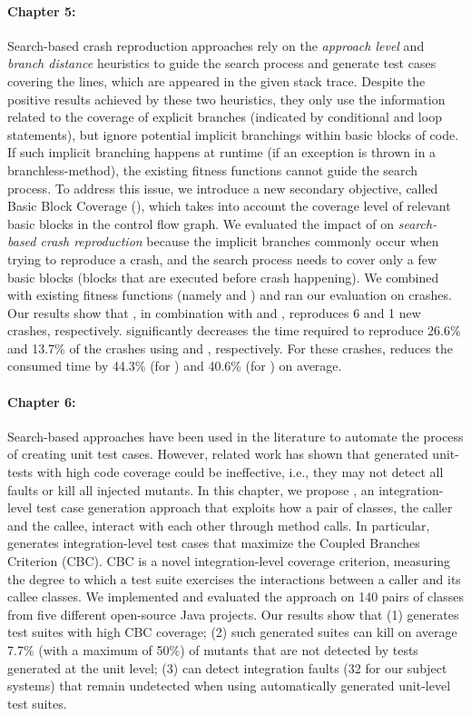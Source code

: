 \paragraph{Chapter 5:}%
Search-based crash reproduction approaches rely on the \emph{approach level} and \emph{branch distance} heuristics to guide the search process and generate test cases covering the lines, which are appeared in the given stack trace.
Despite the positive results achieved by these two heuristics, they only use the information related to the coverage of explicit branches (\eg indicated by conditional and loop statements), but ignore potential implicit branchings within basic blocks of code. 
If such implicit branching happens at runtime (\eg if an exception is thrown in a branchless-method), the existing fitness functions cannot guide the search process. 
To address this issue, we introduce a new secondary objective, called Basic Block Coverage (\bbc), which takes into account the coverage level of relevant basic blocks in the control flow graph. We evaluated the impact of \bbc on \emph{search-based crash reproduction} because the implicit branches commonly occur when trying to reproduce a crash, and the search process needs to cover only a few basic blocks (\ie blocks that are executed before crash happening). We combined \bbc with existing fitness functions (namely \integ and \WS) and ran our evaluation on \crashpack crashes.
Our results show that \bbc, in combination with \integ and \WS, reproduces 6 and 1 new crashes, respectively.
\bbc significantly decreases the time required to reproduce 26.6\% and 13.7\% of the crashes using \integ and \WS, respectively. For these crashes, \bbc reduces the consumed time by 44.3\% (for \integ) and 40.6\% (for \WS) on average.

\paragraph{Chapter 6:}%
Search-based approaches have been used in the literature to automate the process of creating unit test cases. However, related work has shown that generated unit-tests with high code coverage could be ineffective, i.e., they may not detect all faults or kill all injected mutants. 
In this chapter, we propose \cling, an integration-level test case generation approach that exploits how a pair of classes, the caller and the callee, interact with each other through method calls. In particular, \cling generates integration-level test cases that maximize the Coupled Branches Criterion (CBC). CBC is a novel integration-level coverage criterion, measuring the degree to which a test suite exercises the interactions between a caller and its callee classes. 
We implemented \cling and evaluated the approach on 140 pairs of classes from five different open-source Java projects. Our results show that (1) \cling generates test suites with high CBC coverage; (2) such generated suites can kill 
on average 7.7\% (with a maximum of 50\%) of mutants that are not detected by tests generated at the unit level; (3) \cling can detect integration faults (32 for our subject systems) that remain undetected when using automatically generated unit-level test suites. 

